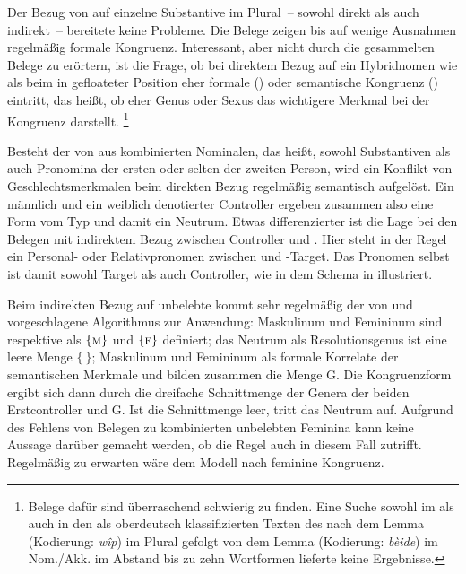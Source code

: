 Der Bezug von  auf einzelne Substantive im Plural~-- sowohl direkt
als auch indirekt~-- bereitete keine Probleme. Die Belege zeigen bis auf wenige
Ausnahmen regelmäßig formale Kongruenz. Interessant, aber
nicht durch die gesammelten Belege zu erörtern, ist die Frage, ob bei direktem
Bezug auf ein Hybridnomen wie  
als  beim  in gefloateter
Position eher formale () oder semantische
Kongruenz () eintritt, das heißt, ob eher
Genus oder Sexus das wichtigere Merkmal bei
der Kongruenz darstellt.%
%
	\footnote{Belege dafür sind überraschend schwierig zu finden. Eine Suche
		sowohl im \CAO{} als auch in den als oberdeutsch klassifizierten Texten
		des \REM{} nach dem Lemma  (Kodierung: \emph{wîp}) im Plural
		gefolgt von dem Lemma  (Kodierung: \emph{bèide}) im
		Nom./Akk. im Abstand bis zu zehn Wortformen lieferte keine Ergebnisse.}

Besteht der  von  aus kombinierten Nominalen, das
heißt, sowohl Substantiven als auch
Pronomina der ersten oder selten der zweiten Person, wird
ein Konflikt von Geschlechtsmerkmalen beim direkten Bezug
regelmäßig semantisch aufgelöst. Ein männlich und ein weiblich
denotierter Controller ergeben zusammen also eine Form vom Typ
 und damit ein Neutrum. Etwas differenzierter ist die Lage bei den
Belegen mit indirektem Bezug zwischen Controller und . Hier steht
in der Regel ein Personal- oder Relativpronomen zwischen
 und -Target. Das Pronomen selbst ist damit
sowohl Target als auch Controller, wie in dem Schema in
 illustriert.

Beim indirekten Bezug auf unbelebte  kommt
sehr regelmäßig der von \citet[184]{wechslerzlatic2003} und
\citet[577]{wechsler2009} vorgeschlagene Algorithmus zur Anwendung: Maskulinum
und Femininum sind respektive als $\{\textsc{m}\}$ und $\{\textsc{f}\}$
definiert; das Neutrum als Resolutionsgenus ist eine
leere Menge $\{\ \}$; Maskulinum und Femininum als formale Korrelate der
semantischen Merkmale  und
 bilden zusammen die Menge G. Die Kongruenzform ergibt
sich dann durch die dreifache Schnittmenge der Genera der beiden Erstcontroller
und G. Ist die Schnittmenge leer, tritt das Neutrum auf. Aufgrund des
Fehlens von Belegen zu kombinierten unbelebten Feminina kann keine Aussage
darüber gemacht werden, ob die Regel auch in diesem Fall zutrifft. Regelmäßig
zu erwarten wäre dem Modell nach feminine Kongruenz.

